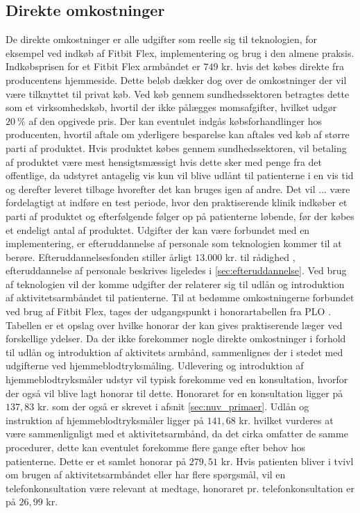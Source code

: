 \subsection{Direkte omkostninger}
De direkte omkostninger er alle  udgifter som reelle sig til teknologien, for eksempel ved indkøb af Fitbit Flex, implementering og brug i den almene praksis.  
Indkøbsprisen for et Fitbit Flex armbåndet er $749$ kr. hvis det købes direkte fra producentens hjemmeside. Dette beløb dækker dog over de omkostninger der vil være tilknyttet til privat køb. 
Ved køb gennem sundhedssektoren betragtes dette som et virksomhedskøb, hvortil der ikke pålægges momsafgifter, hvilket udgør $20~\%$ af den opgivede pris. 
Der kan eventulet indgås købsforhandlinger hos producenten, hvortil aftale om yderligere besparelse kan aftales ved køb af større parti af produktet. Hvis produktet købes gennem sundhedssektoren, vil betaling af produktet være mest hensigtsmæssigt hvis dette sker med penge fra det offentlige, da udstyret antagelig vis kun vil blive udlånt til patienterne i en vis tid og derefter leveret tilbage hvorefter det kan bruges igen af andre. Det vil ... være fordelagtigt at indføre en test periode, hvor den praktiserende klinik indkøber et parti af produktet og efterfølgende følger op på patienterne løbende, før der købes et endeligt antal af produktet. 
Udgifter der kan være forbundet med en implementering, er efteruddannelse af personale som teknologien kommer til at berøre. Efteruddannelsesfonden stiller årligt $13.000$ kr. til rådighed \citep{vedsted2005}, efteruddannelse af personale beskrives ligeledes i \autoref{sec:efteruddannelse}.   
Ved brug af teknologien vil der komme udgifter der relaterer sig til udlån og introduktion af aktivitetsarmbåndet til patienterne. Til at bedømme omkostningerne forbundet ved brug af Fitbit Flex, tages der udgangspunkt i honorartabellen fra PLO \citep{honorartabel2016}. Tabellen er et opslag over hvilke honorar der kan gives praktiserende læger ved forskellige ydelser.
Da der ikke forekommer nogle direkte omkostninger i forhold til udlån og introduktion af aktivitets armbånd, sammenlignes der i stedet med udgifterne ved hjemmeblodtryksmåling. Udlevering og introduktion af hjemmeblodtryksmåler udstyr vil typisk forekomme ved en konsultation, hvorfor der også vil blive lagt honorar til dette. Honoraret for en konsultation ligger på $137,83$ kr. som der også er skrevet i afsnit \autoref{sec:nuv_primaer}. Udlån og instruktion af hjemmeblodtryksmåler ligger på $141,68$ kr. hvilket vurderes at være sammenlignligt med et aktivitetsarmbånd, da det cirka omfatter de samme procedurer, dette kan eventulet forekomme flere gange efter behov hos patienterne. Dette er et samlet honorar på $279,51$ kr. Hvis patienten bliver i tvivl om brugen af aktivitetsarmbåndet eller har flere spørgsmål, vil en telefonkonsultation være relevant at medtage, honoraret pr. telefonkonsultation er på $26,99$ kr.

